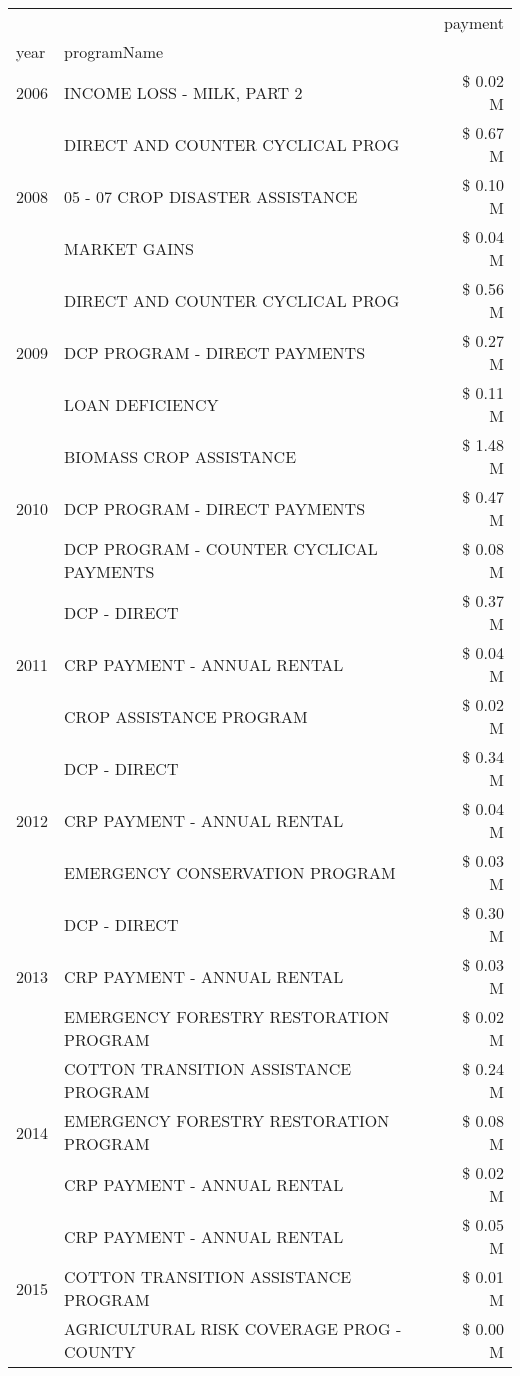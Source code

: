 \begin{tabular}{llr}
\toprule
 &  & payment \\
year & programName &  \\
\midrule
2006 & INCOME LOSS - MILK, PART 2 & \$ 0.02 M \\
\cline{1-3}
\multirow[t]{3}{*}{2008} & DIRECT AND COUNTER CYCLICAL PROG & \$ 0.67 M \\
 & 05 - 07 CROP DISASTER ASSISTANCE & \$ 0.10 M \\
 & MARKET GAINS & \$ 0.04 M \\
\cline{1-3}
\multirow[t]{3}{*}{2009} & DIRECT AND COUNTER CYCLICAL PROG & \$ 0.56 M \\
 & DCP PROGRAM - DIRECT PAYMENTS & \$ 0.27 M \\
 & LOAN DEFICIENCY & \$ 0.11 M \\
\cline{1-3}
\multirow[t]{3}{*}{2010} & BIOMASS CROP ASSISTANCE & \$ 1.48 M \\
 & DCP PROGRAM - DIRECT PAYMENTS & \$ 0.47 M \\
 & DCP PROGRAM - COUNTER CYCLICAL PAYMENTS & \$ 0.08 M \\
\cline{1-3}
\multirow[t]{3}{*}{2011} & DCP - DIRECT & \$ 0.37 M \\
 & CRP PAYMENT - ANNUAL RENTAL & \$ 0.04 M \\
 & CROP ASSISTANCE PROGRAM & \$ 0.02 M \\
\cline{1-3}
\multirow[t]{3}{*}{2012} & DCP - DIRECT & \$ 0.34 M \\
 & CRP PAYMENT - ANNUAL RENTAL & \$ 0.04 M \\
 & EMERGENCY CONSERVATION PROGRAM & \$ 0.03 M \\
\cline{1-3}
\multirow[t]{3}{*}{2013} & DCP - DIRECT & \$ 0.30 M \\
 & CRP PAYMENT - ANNUAL RENTAL & \$ 0.03 M \\
 & EMERGENCY FORESTRY RESTORATION PROGRAM & \$ 0.02 M \\
\cline{1-3}
\multirow[t]{3}{*}{2014} & COTTON TRANSITION ASSISTANCE PROGRAM & \$ 0.24 M \\
 & EMERGENCY FORESTRY RESTORATION PROGRAM & \$ 0.08 M \\
 & CRP PAYMENT - ANNUAL RENTAL & \$ 0.02 M \\
\cline{1-3}
\multirow[t]{3}{*}{2015} & CRP PAYMENT - ANNUAL RENTAL & \$ 0.05 M \\
 & COTTON TRANSITION ASSISTANCE PROGRAM & \$ 0.01 M \\
 & AGRICULTURAL RISK COVERAGE PROG - COUNTY & \$ 0.00 M \\

\end{tabular}
